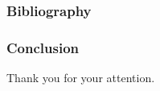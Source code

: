 \begin{frame}[shrink=20]
  \frametitle{Bibliography}
  \printbibliography
\end{frame}

\begin{frame}
  \frametitle{Conclusion}
  \begin{center}
    \Huge Thank you for your attention.
  \end{center}
\end{frame}